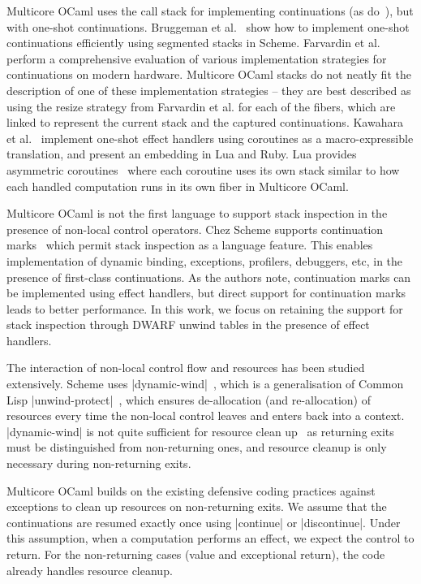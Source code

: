 \documentclass[sigplan,screen]{acmart}
\begin{document}
Multicore OCaml uses the call stack for implementing continuations (as
do~\cite{Leijen14, Kiselyov12}), but with one-shot continuations. Bruggeman et
al.~\cite{Bruggeman96} show how to implement one-shot continuations efficiently
using segmented stacks in Scheme. Farvardin et al.~\cite{Farvardin20} perform a
comprehensive evaluation of various implementation strategies for continuations
on modern hardware. Multicore OCaml stacks do not neatly fit the description of
one of these implementation strategies -- they are best described as using the
resize strategy from Farvardin et al. for each of the fibers, which are linked
to represent the current stack and the captured continuations. Kawahara et
al.~\cite{Kawahara20} implement one-shot effect handlers using coroutines as a
macro-expressible translation, and present an embedding in Lua and Ruby. Lua
provides asymmetric coroutines~\cite{Lua} where each coroutine uses its own
stack similar to how each handled computation runs in its own fiber in
Multicore OCaml.

Multicore OCaml is not the first language to support stack inspection in the
presence of non-local control operators. Chez Scheme supports continuation
marks~\cite{Flatt20} which permit stack inspection as a language feature. This
enables implementation of dynamic binding, exceptions, profilers, debuggers,
etc, in the presence of first-class continuations. As the authors note,
continuation marks can be implemented using effect handlers, but direct support
for continuation marks leads to better performance. In this work, we focus on
retaining the support for stack inspection through DWARF unwind tables in the
presence of effect handlers.

The interaction of non-local control flow and resources has been studied
extensively. Scheme uses |dynamic-wind|~\cite{R5RS}, which is a generalisation
of Common Lisp |unwind-protect|~\cite{Steele90}, which ensures de-allocation
(and re-allocation) of resources every time the non-local control leaves and
enters back into a context. |dynamic-wind| is not quite sufficient for resource
clean up~\cite{Kiselyov,Sitaram03} as returning exits must be distinguished
from non-returning ones, and resource cleanup is only necessary during
non-returning exits.

Multicore OCaml builds on the existing defensive coding practices against
exceptions to clean up resources on non-returning exits. We assume that the
continuations are resumed exactly once using |continue| or |discontinue|. Under
this assumption, when a computation performs an effect, we expect the control
to return. For the non-returning cases (value and exceptional return), the code
already handles resource cleanup.
\end{document}
